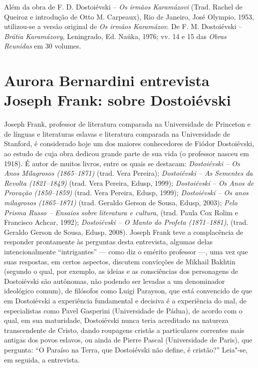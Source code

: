 
Além da obra de F. D. Dostoiévski -- \emph{Os irmãos Karamázovi} (Trad.
Rachel de Queiroz e introdução de Otto M. Carpeaux), Rio de Janeiro,
José Olympio, 1953, utilizou-se a versão original de \emph{Os irmãos
Karamázov}. De F. M. Dostoiévski -- \emph{Brátia Karamázovy},
Leningrado, Ed. Naúka, 1976; vv. 14 e 15 das \emph{Obras Reunidas} em 30
volumes.

\chapter*{Aurora Bernardini entrevista Joseph Frank: sobre Dostoiévski}





Joseph Frank, professor de literatura comparada na Universidade de
Princeton e de línguas e literaturas eslavas e literatura comparada na
Universidade de Stanford, é considerado hoje um dos maiores conhecedores
de Fiódor Dostoiévski, ao estudo de cuja obra dedicou grande parte de
sua vida (o professor nasceu em 1918). É autor de muitos livros, entre
os quais se destacam: \emph{Dostoiévski -- Os Anos Milagrosos (1865--1871)}
(trad. Vera Pereira); \emph{Dostoiévski -- As Sementes da Revolta (1821--1849)}
(trad. Vera Pereira, Edusp, 1999); \emph{Dostoiévski -- Os Anos de Provação
(1850--1859)} (trad. Vera Pereira, Edusp, 1999); \emph{Dostoiévski -- Os anos
milagrosos (1865--1871)} (trad. Geraldo Gerson de Sousa, Edusp,
2003); \emph{Pelo Prisma Russo -- Ensaios sobre literatura e cultura}, (trad.
Paula Cox Rolim e Francisco Achcar, 1992); \emph{Dostoiévski -- O Manto do
Profeta (1871--1881)}, (trad. Geraldo Gerson de Sousa, Edusp, 2008). Joseph
Frank teve a complacência de responder prontamente às perguntas desta
entrevista, algumas delas intencionalmente ``intrigantes'' --- como diz o
emérito professor ---, uma vez que suas respostas, em certos aspectos,
discutem convicções de Mikhail Bakhtin (segundo o qual, por exemplo, as
ideias e as consciências dos personagens de Dostoiévski são autônomas,
não podendo ser levadas a um denominador ideológico comum), de filósofos
como Luigi Parayson, que está convencido de que em Dostoiévski a
experiência fundamental e decisiva é a experiência do mal, de
especialistas como Pavel Gasperini (Universidade de Pádua), de acordo
com o qual, em sua maturidade, Dostoiévski nunca teria acreditado na
natureza transcendente de Cristo, dando roupagens cristãs a particulares
correntes mais antigas dos povos eslavos, ou ainda de Pierre Pascal
(Universidade de Paris), que pergunta: ``O Paraíso na Terra, que
Dostoiévski não define, é cristão?'' Leia"-se, em seguida, a entrevista.

